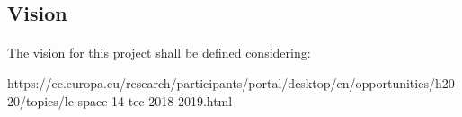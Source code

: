 \subsection{Vision}
\paragraph{} The vision for this project shall be defined considering:

https://ec.europa.eu/research/participants/portal/desktop/en/opportunities/h2020/topics/lc-space-14-tec-2018-2019.html
